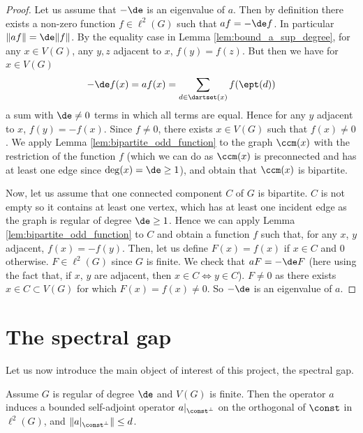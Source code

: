 \begin{proof}
  Let us assume that $- \de$ is an eigenvalue of $a$.
  Then by definition there exists a non-zero function $f \in \ell^2(G)$ such that
  $af=-\de f$.
  In particular $\|af\|=\de \|f\|$. By the equality case in Lemma
  \ref{lem:bound_a_sup_degree}, for any $x \in V(G)$, any $y, z$ adjacent to $x$,
  $f(y)=f(z)$.
  But then we have for $x \in V(G)$
  \begin{equation*}
    - \de f(x) = af(x) = \sum_{d \in \dartset(x)} f(\ept(d))
  \end{equation*}
  a sum with $\de \neq 0$ terms in which all terms are equal. Hence for any $y$
  adjacent to $x$, $f(y)=-f(x)$.
  Since $f \neq 0$, there exists $x \in V(G)$ such that $f(x) \neq 0$.
  We apply Lemma \ref{lem:bipartite_odd_function} to the graph $\ccm(x)$ with the
  restriction of the function $f$ (which we can do as $\ccm(x)$ is preconnected
  and has at least one edge since $\deg(x) = \de \geq 1$),
  and obtain that $\ccm(x)$ is bipartite.

  Now, let us assume that one connected component $C$ of $G$ is bipartite.
  $C$ is not empty so it contains at least one vertex, which has at least one
  incident edge as the graph is regular of degree $\de \geq 1$.
  Hence we can apply Lemma \ref{lem:bipartite_odd_function} to $C$
  and obtain a function $f$ such that, for any $x$, $y$ adjacent, $f(x)=-f(y)$.
  Then, let us define $F(x) = f(x)$ if $x \in C$ and $0$ otherwise.
  $F \in \ell^2(G)$ since $G$ is finite.
  We check that $aF=- \de F$ (here using the fact that, if $x$, $y$ are adjacent,
  then $x \in C \Leftrightarrow y \in C$). $F \neq 0$ as there exists $x \in C \subset V(G)$
  for which $F(x) = f(x) \neq 0$. So $-\de$ is an eigenvalue of $a$.
\end{proof}

\section{The spectral gap}

Let us now introduce the main object of interest of this project, the spectral gap.

\begin{lemma}
  \label{lem:projection_orth_constant}
  Assume $G$ is regular of degree $\de$ and $V(G)$ is finite.
  Then the operator $a$ induces a bounded self-adjoint operator $a|_{\const^\perp}$
  on the orthogonal of $\const$ in $\ell^2(G)$, and $\|a|_{\const^\perp}\| \leq d$.
\end{lemma}

